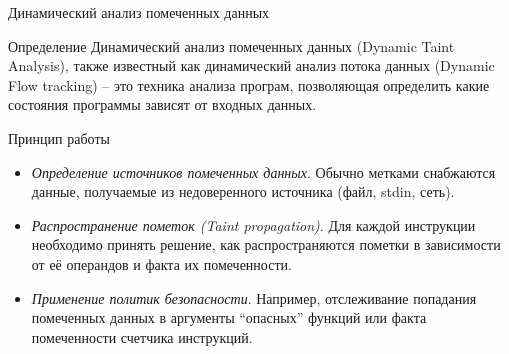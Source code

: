 \documentclass[10pt]{beamer}
\begin{document}
\begin{frame}{Динамический анализ помеченных данных}
  \begin{block}{Определение}
    Динамический анализ помеченных данных (Dynamic Taint Analysis), также известный как динамический анализ потока данных (Dynamic Flow tracking) -- это техника анализа програм, позволяющая определить какие состояния программы зависят от входных данных.
  \end{block}
  \begin{block}{Принцип работы}
    \begin{itemize}
        \item {\em Определение источников помеченных данных}. Обычно метками снабжаются данные, получаемые из недоверенного источника (файл, stdin, сеть).
        \item {\em Распространение пометок (Taint propagation)}. Для каждой инструкции необходимо принять решение, как распространяются пометки в зависимости от её операндов и факта их помеченности.
        \item {\em Применение политик безопасности}. Например, отслеживание попадания помеченных данных в аргументы ``опасных'' функций или факта помеченности счетчика инструкций.
    \end{itemize}
  \end{block}
\end{frame}
\end{document}
